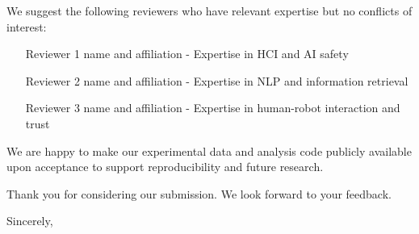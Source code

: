 \documentclass[11pt]{article}
\begin{document}
\vspace{0.5cm}

\noindent We suggest the following reviewers who have relevant expertise but no conflicts of interest:
\begin{itemize}
    \item [Reviewer 1 name and affiliation] - Expertise in HCI and AI safety
    \item [Reviewer 2 name and affiliation] - Expertise in NLP and information retrieval
    \item [Reviewer 3 name and affiliation] - Expertise in human-robot interaction and trust
\end{itemize}

\vspace{0.5cm}

\noindent We are happy to make our experimental data and analysis code publicly available upon acceptance to support reproducibility and future research.

\vspace{0.5cm}

\noindent Thank you for considering our submission. We look forward to your feedback.

\vspace{1cm}

\noindent Sincerely,

\vspace{0.5cm}
\noindent [Affiliations]
\end{document}
